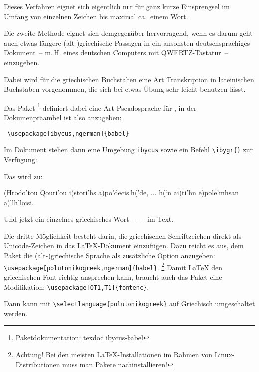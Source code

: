 Dieses Verfahren eignet sich eigentlich nur für ganz kurze Einsprengsel im Umfang von
einzelnen Zeichen bis maximal ca.\ einem Wort.



Die zweite Methode eignet sich demgegenüber hervorragend, wenn es darum geht auch etwas
längere (alt-)griechische Passagen in ein ansonsten deutschsprachiges Dokument~-- m.\,H. eines
deutschen Computers mit QWERTZ-Tastatur~-- einzugeben.

Dabei wird für die griechischen Buchstaben eine Art Transkription in lateinischen Buchstaben
vorgenommen, die sich bei etwas Übung sehr leicht benutzen lässt.

Das Paket %
\footnote{Paketdokumentation: texdoc ibycus-babel}
definiert dabei eine Art Pseudosprache für ,
in der Dokumenpräambel ist also anzugeben:

\begin{lstlisting}
 \usepackage[ibycus,ngerman]{babel}
\end{lstlisting}

Im Dokument stehen dann eine Umgebung \lstinline/ibycus/ sowie ein Befehl \lstinline/\ibygr{}/
zur Verfügung:


Das wird zu:

 \begin{ibycus}
  (Hrodo'tou Qouri’ou i(stori’hs a)po’decis h(’de,
  ...
  h(‘n ai)ti’hn e)pole’mhsan a)llh’loisi.
  \end{ibycus}

  Und jetzt ein einzelnes griechisches Wort~-- ~-- im Text.






Die dritte Möglichkeit besteht darin, die griechischen Schriftzeichen direkt als Unicode-Zeichen
in das \LaTeX -Dokument einzufügen. Dazu reicht es aus, dem Paket  die
(alt-)griechische Sprache als zusätzliche Option anzugeben:
\lstinline/\usepackage[polutonikogreek,ngerman]{babel}/.
\footnote{Achtung! Bei den meisten \LaTeX -Installationen im Rahmen von Linux-Distributionen muss
man Pakete nachinstallieren!}
Damit \LaTeX{} den griechischen Font richtig ansprechen kann, braucht auch das Paket 
eine Modifikation: \lstinline/\usepackage[OT1,T1]{fontenc}/.

Dann kann mit \lstinline/\selectlanguage{polutonikogreek}/ auf Griechisch umgeschaltet werden.

